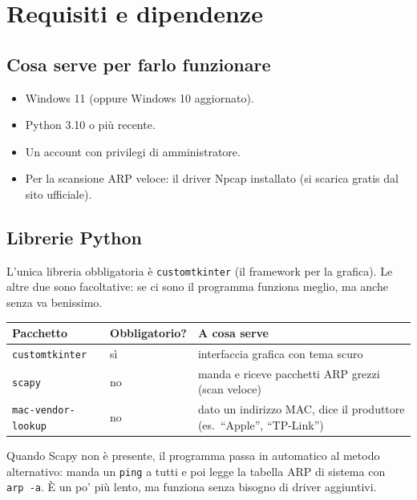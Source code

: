 \documentclass[a4paper,11pt]{article}
\begin{document}
\section{Requisiti e dipendenze}

\subsection{Cosa serve per farlo funzionare}
\begin{itemize}[nosep]
  \item Windows 11 (oppure Windows 10 aggiornato).
  \item Python 3.10 o più recente.
  \item Un account con privilegi di amministratore.
  \item Per la scansione ARP veloce: il driver Npcap installato
        (si scarica gratis dal sito ufficiale).
\end{itemize}

\subsection{Librerie Python}
L'unica libreria obbligatoria è \texttt{customtkinter} (il
framework per la grafica).  Le altre due sono facoltative: se
ci sono il programma funziona meglio, ma anche senza va
benissimo.

\begin{table}[H]
\centering
\small
\begin{tabularx}{0.92\textwidth}{llX}
  \toprule
  \textbf{Pacchetto}       & \textbf{Obbligatorio?} & \textbf{A cosa serve} \\
  \midrule
  \texttt{customtkinter}   & sì & interfaccia grafica con tema scuro \\
  \texttt{scapy}           & no & manda e riceve pacchetti ARP grezzi
                                  (scan veloce) \\
  \texttt{mac-vendor-lookup}& no & dato un indirizzo MAC, dice il
                                   produttore (es.\ ``Apple'', ``TP-Link'') \\
  \bottomrule
\end{tabularx}
\end{table}

Quando Scapy non è presente, il programma passa in automatico
al metodo alternativo: manda un \texttt{ping} a tutti e poi
legge la tabella ARP di sistema con \texttt{arp~-a}.  È un po'
più lento, ma funziona senza bisogno di driver aggiuntivi.
\end{document}
